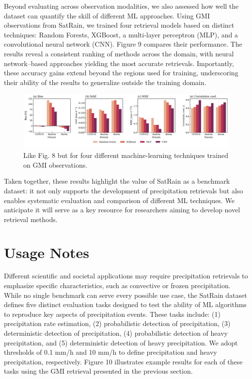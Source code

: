 \documentclass[11pt]{article}
\begin{document}
Beyond evaluating across observation modalities, we also assessed how well the
dataset can quantify the skill of different ML approaches. Using
GMI observations from SatRain, we trained four retrieval models based on
distinct techniques: Random Forests, XGBoost, a multi-layer perceptron (MLP),
and a convolutional neural network (CNN). Figure 9 compares their performance.
The results reveal a consistent ranking of methods across the domain, with
neural network–based approaches yielding the most accurate retrievals.
Importantly, these accuracy gains extend beyond the regions used for training,
underscoring their ability of the results to generalize outside the training
domain.

\begin{figure}[htbp]
	\centering
	\includegraphics[width=1.0\textwidth]{figures/fig11}
	\caption{
	  Like Fig. 8 but for four different machine-learning techniques trained on GMI observations.
	}
	\label{fig:sensor_comparison}
\end{figure}

Taken together, these results highlight the value of SatRain as a benchmark
dataset: it not only supports the development of precipitation retrievals but
also enables systematic evaluation and comparison of different ML
techniques. We anticipate it will serve as a key resource for researchers aiming
to develop novel retrieval methods.

\section{Usage Notes}

Different scientific and societal applications may require precipitation
retrievals to emphasize specific characteristics, such as convective or frozen
precipitation. While no single benchmark can serve every possible use case, the
SatRain dataset defines five distinct evaluation tasks designed to test the
ability of ML algorithms to reproduce key aspects of precipitation
events. These tasks include: (1) precipitation rate estimation, (2)
probabilistic detection of precipitation, (3) deterministic detection of
precipitation, (4) probabilistic detection of heavy precipitation, and (5)
deterministic detection of heavy precipitation. We adopt thresholds of 0.1 mm/h
and 10 mm/h to define precipitation and heavy precipitation, respectively.
Figure 10 illustrates example results for each of these tasks using the GMI
retrieval presented in the previous section.
\end{document}
